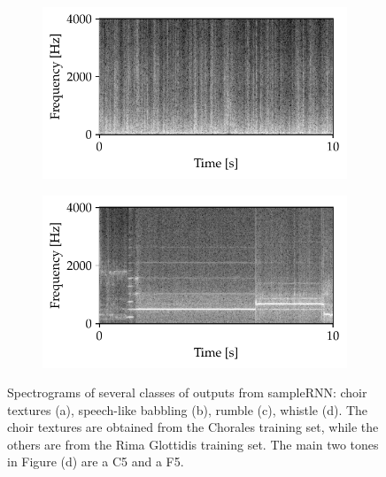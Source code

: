 \begin{figure}[h]
	\begin{subfigure}[b]{0.45\columnwidth}
		\includegraphics[width=\textwidth]{img/rumble.pdf}
		\subcaption{}
	\end{subfigure}	
	\begin{subfigure}[b]{0.45\columnwidth}
		\includegraphics[width=\textwidth]{img/whistle.pdf}
		\subcaption{}
	\end{subfigure}
	
	
	\caption[SampleRNN - Raw audio generation]{Spectrograms of several classes of outputs from sampleRNN: choir textures (a), speech-like babbling (b), rumble (c), whistle (d). The choir textures are obtained from the Chorales training set, while the others are from the Rima Glottidis training set. The main two tones in Figure (d) are a C5 and a F5.}
	\label{fig:esempi}
\end{figure}